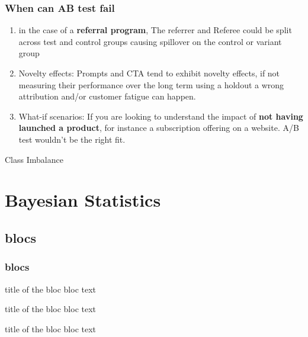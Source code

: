 \documentclass{beamer}
\begin{document}
\begin{frame}[plain]
\end{frame}

\begin{frame}\frametitle{When can AB test fail}
	\begin{enumerate}
		\item in the case of a \textbf{referral program}, The referrer and Referee could be split across test and control groups causing spillover on the control or variant group
		\item Novelty effects: Prompts and CTA tend to exhibit novelty effects, if not measuring their performance over the long term using a holdout a wrong attribution and/or customer fatigue can happen.
		\item What-if scenarios: If you are looking to understand the impact of \textbf{not having launched a product}, for instance a subscription offering on a website. A/B test wouldn’t be the right fit.
	\end{enumerate}
\end{frame}


\begin{frame}
	Class Imbalance
\end{frame}




\section{Bayesian Statistics}

\subsection{blocs}
\begin{frame}\frametitle{blocs}

\begin{block}{title of the bloc}
bloc text
\end{block}

\begin{exampleblock}{title of the bloc}
bloc text
\end{exampleblock}


\begin{alertblock}{title of the bloc}
bloc text
\end{alertblock}
\end{frame}
\end{document}

